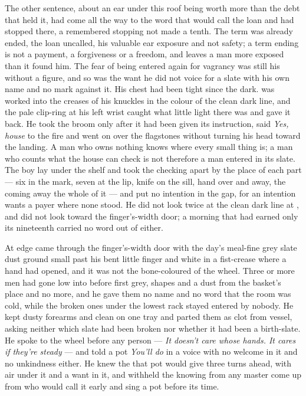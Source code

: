 The other sentence, about an ear under this roof being worth more than the debt that held it, had come all the way to the word that would call the loan and had stopped there, a remembered stopping not made a tenth. The term was already ended, the loan uncalled, his valuable ear exposure and not safety; a term ending is not a payment, a forgiveness or a freedom, and leaves a man more exposed than it found him. The fear of being entered again for vagrancy was still his without a figure, and so was the want he did not voice for a slate with his own name and no mark against it. His chest had been tight since the dark.  was worked into the creases of his knuckles in the colour of the clean dark line, and the pale clip-ring at his left wrist caught what little light there was and gave it back. He took the broom only after it had been given its instruction, said \emph{Yes, house} to the fire and went on over the flagstones without turning his head toward the landing. A man who owns nothing knows where every small thing is; a man who counts what the house can check is not therefore a man entered in its slate. The boy lay under the shelf and took the checking apart by the place of each part --- six in the mark, seven at the lip, knife on the sill, hand over and away, the coming away the whole of it --- and put no intention in the gap, for an intention wants a payer where none stood. He did not look twice at the clean dark line at , and did not look toward the finger's-width door; a morning that had earned only its nineteenth carried no word out of either.

\scenebreak

At  edge  came through the finger's-width door with the day's meal-fine grey slate dust ground small past his bent little finger and white in a fist-crease where a hand had opened, and it was not the bone-coloured  of the wheel. Three or more men had gone low into  before first grey, shapes and a dust from the basket's place and no more, and he gave them no name and no word that the room was cold, while the broken ones under the lowest rack stayed entered by nobody. He kept dusty forearms and clean on one tray and parted them as clot from vessel, asking neither which slate had been broken nor whether it had been a birth-slate. He spoke to the wheel before any person --- \emph{It doesn't care whose hands. It cares if they're steady} --- and told a pot \emph{You'll do} in a voice with no welcome in it and no unkindness either. He knew the  that pot would give three turns ahead, with air under it and a want in it, and withheld the knowing from any master come up from  who would call it early and sing a pot before its time.

